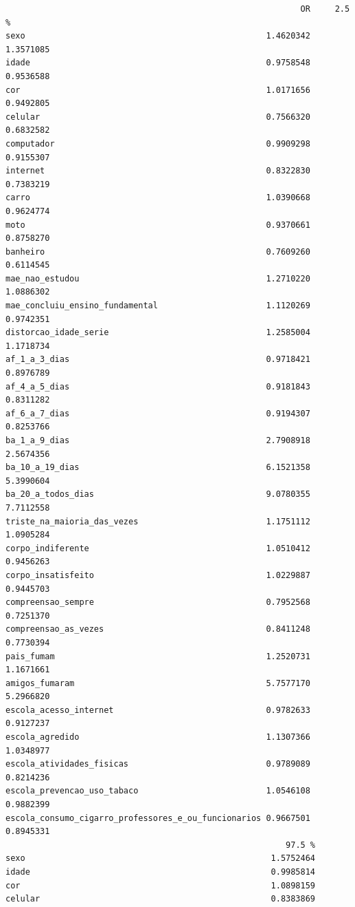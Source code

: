 \documentclass[
]{article}
\begin{document}
\begin{verbatim}
                                                            OR     2.5 %
sexo                                                 1.4620342 1.3571085
idade                                                0.9758548 0.9536588
cor                                                  1.0171656 0.9492805
celular                                              0.7566320 0.6832582
computador                                           0.9909298 0.9155307
internet                                             0.8322830 0.7383219
carro                                                1.0390668 0.9624774
moto                                                 0.9370661 0.8758270
banheiro                                             0.7609260 0.6114545
mae_nao_estudou                                      1.2710220 1.0886302
mae_concluiu_ensino_fundamental                      1.1120269 0.9742351
distorcao_idade_serie                                1.2585004 1.1718734
af_1_a_3_dias                                        0.9718421 0.8976789
af_4_a_5_dias                                        0.9181843 0.8311282
af_6_a_7_dias                                        0.9194307 0.8253766
ba_1_a_9_dias                                        2.7908918 2.5674356
ba_10_a_19_dias                                      6.1521358 5.3990604
ba_20_a_todos_dias                                   9.0780355 7.7112558
triste_na_maioria_das_vezes                          1.1751112 1.0905284
corpo_indiferente                                    1.0510412 0.9456263
corpo_insatisfeito                                   1.0229887 0.9445703
compreensao_sempre                                   0.7952568 0.7251370
compreensao_as_vezes                                 0.8411248 0.7730394
pais_fumam                                           1.2520731 1.1671661
amigos_fumaram                                       5.7577170 5.2966820
escola_acesso_internet                               0.9782633 0.9127237
escola_agredido                                      1.1307366 1.0348977
escola_atividades_fisicas                            0.9789089 0.8214236
escola_prevencao_uso_tabaco                          1.0546108 0.9882399
escola_consumo_cigarro_professores_e_ou_funcionarios 0.9667501 0.8945331
                                                         97.5 %
sexo                                                  1.5752464
idade                                                 0.9985814
cor                                                   1.0898159
celular                                               0.8383869

\end{verbatim}
\end{document}

